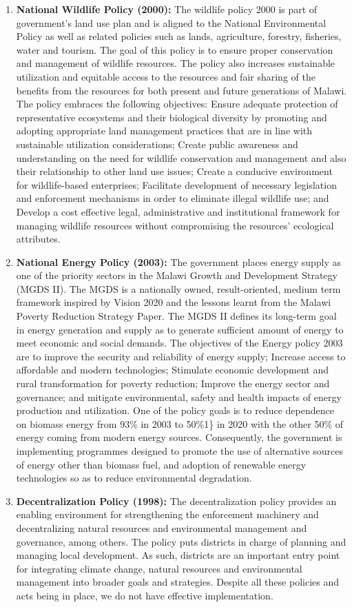 \documentclass[
]{book}
\begin{document}
\begin{enumerate}
\item
  \textbf{National Wildlife Policy (2000):} The wildlife policy 2000 is part of government's land use plan and is aligned to the National Environmental Policy as well as related policies such as lands, agriculture, forestry, fisheries, water and tourism. The goal of this policy is to ensure proper conservation and management of wildlife resources. The policy also increases sustainable utilization and equitable access to the resources and fair sharing of the benefits from the resources for both present and future generations of Malawi. The policy embraces the following objectives: Ensure adequate protection of representative ecosystems and their biological diversity by promoting and adopting appropriate land management practices that are in line with sustainable utilization considerations; Create public awareness and understanding on the need for wildlife conservation and management and also their relationship to other land use issues; Create a conducive environment for wildlife-based enterprises; Facilitate development of necessary legislation and enforcement mechanisms in order to eliminate illegal wildlife use; and Develop a cost effective legal, administrative and institutional framework for managing wildlife resources without compromising the resources' ecological attributes.
\item
  \textbf{National Energy Policy (2003):} The government places energy supply as one of the priority sectors in the Malawi Growth and Development Strategy (MGDS II). The MGDS is a nationally owned, result-oriented, medium term framework inspired by Vision 2020 and the lessons learnt from the Malawi Poverty Reduction Strategy Paper. The MGDS II defines its long-term goal in energy generation and supply as to generate sufficient amount of energy to meet economic and social demands. The objectives of the Energy policy 2003 are to improve the security and reliability of energy supply; Increase access to affordable and modern technologies; Stimulate economic development and rural transformation for poverty reduction; Improve the energy sector and governance; and mitigate environmental, safety and health impacts of energy production and utilization. One of the policy goals is to reduce dependence on biomass energy from 93\% in 2003 to 50\%1\} in 2020 with the other 50\% of energy coming from modern energy sources. Consequently, the government is implementing programmes designed to promote the use of alternative sources of energy other than biomass fuel, and adoption of renewable energy technologies so as to reduce environmental degradation.
\item
  \textbf{Decentralization Policy (1998):} The decentralization policy provides an enabling environment for strengthening the enforcement machinery and decentralizing natural resources and environmental management and governance, among others. The policy puts districts in charge of planning and managing local development. As such, districts are an important entry point for integrating climate change, natural resources and environmental management into broader goals and strategies. Despite all these policies and acts being in place, we do not have effective implementation.
\end{enumerate}
\end{document}
